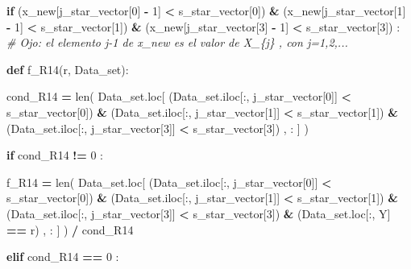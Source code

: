 \documentclass[
  11pt,
  a4paper,
]{article}
\newenvironment{Shaded}{\begin{snugshade}}{\end{snugshade}}
\newcommand{\BuiltInTok}[1]{#1}
\newcommand{\CommentTok}[1]{\textcolor[rgb]{0.56,0.35,0.01}{\textit{#1}}}
\newcommand{\ControlFlowTok}[1]{\textcolor[rgb]{0.13,0.29,0.53}{\textbf{#1}}}
\newcommand{\DecValTok}[1]{\textcolor[rgb]{0.00,0.00,0.81}{#1}}
\newcommand{\KeywordTok}[1]{\textcolor[rgb]{0.13,0.29,0.53}{\textbf{#1}}}
\newcommand{\NormalTok}[1]{#1}
\newcommand{\OperatorTok}[1]{\textcolor[rgb]{0.81,0.36,0.00}{\textbf{#1}}}
\newcommand{\StringTok}[1]{\textcolor[rgb]{0.31,0.60,0.02}{#1}}
\begin{document}
\begin{Shaded}
\begin{Highlighting}[]
            \ControlFlowTok{if}\NormalTok{ (x\_new[j\_star\_vector[}\DecValTok{0}\NormalTok{] }\OperatorTok{{-}} \DecValTok{1}\NormalTok{] }\OperatorTok{\textless{}}\NormalTok{ s\_star\_vector[}\DecValTok{0}\NormalTok{]) }\OperatorTok{\&}\NormalTok{ (x\_new[j\_star\_vector[}\DecValTok{1}\NormalTok{] }\OperatorTok{{-}} \DecValTok{1}\NormalTok{] }\OperatorTok{\textless{}}\NormalTok{ s\_star\_vector[}\DecValTok{1}\NormalTok{]) }\OperatorTok{\&}\NormalTok{ (x\_new[j\_star\_vector[}\DecValTok{3}\NormalTok{] }\OperatorTok{{-}} \DecValTok{1}\NormalTok{] }\OperatorTok{\textless{}}\NormalTok{ s\_star\_vector[}\DecValTok{3}\NormalTok{]) :  }\CommentTok{\# Ojo: el elemento j{-}1 de x\_new es el valor de X\_\{j\} , con j=1,2,...}


                \KeywordTok{def}\NormalTok{ f\_R14(r, Data\_set):}

\NormalTok{                        cond\_R14 }\OperatorTok{=} \BuiltInTok{len}\NormalTok{( Data\_set.loc[ (Data\_set.iloc[:, j\_star\_vector[}\DecValTok{0}\NormalTok{]] }\OperatorTok{\textless{}}\NormalTok{ s\_star\_vector[}\DecValTok{0}\NormalTok{]) }\OperatorTok{\&}\NormalTok{ (Data\_set.iloc[:, j\_star\_vector[}\DecValTok{1}\NormalTok{]] }\OperatorTok{\textless{}}\NormalTok{ s\_star\_vector[}\DecValTok{1}\NormalTok{]) }\OperatorTok{\&}\NormalTok{ (Data\_set.iloc[:, j\_star\_vector[}\DecValTok{3}\NormalTok{]] }\OperatorTok{\textless{}}\NormalTok{ s\_star\_vector[}\DecValTok{3}\NormalTok{]) , : ] ) }

                        \ControlFlowTok{if}\NormalTok{  cond\_R14 }\OperatorTok{!=} \DecValTok{0}\NormalTok{ :}

\NormalTok{                            f\_R14 }\OperatorTok{=} \BuiltInTok{len}\NormalTok{( Data\_set.loc[ (Data\_set.iloc[:, j\_star\_vector[}\DecValTok{0}\NormalTok{]] }\OperatorTok{\textless{}}\NormalTok{ s\_star\_vector[}\DecValTok{0}\NormalTok{]) }\OperatorTok{\&}\NormalTok{ (Data\_set.iloc[:, j\_star\_vector[}\DecValTok{1}\NormalTok{]] }\OperatorTok{\textless{}}\NormalTok{ s\_star\_vector[}\DecValTok{1}\NormalTok{])  }\OperatorTok{\&}\NormalTok{ (Data\_set.iloc[:, j\_star\_vector[}\DecValTok{3}\NormalTok{]] }\OperatorTok{\textless{}}\NormalTok{ s\_star\_vector[}\DecValTok{3}\NormalTok{]) }\OperatorTok{\&}\NormalTok{ (Data\_set.loc[:, }\StringTok{\textquotesingle{}Y\textquotesingle{}}\NormalTok{] }\OperatorTok{==}\NormalTok{ r) , : ] ) }\OperatorTok{/}\NormalTok{ cond\_R14}

                        \ControlFlowTok{elif}\NormalTok{ cond\_R14 }\OperatorTok{==} \DecValTok{0}\NormalTok{ :}


\end{Highlighting}
\end{Shaded}
\end{document}
